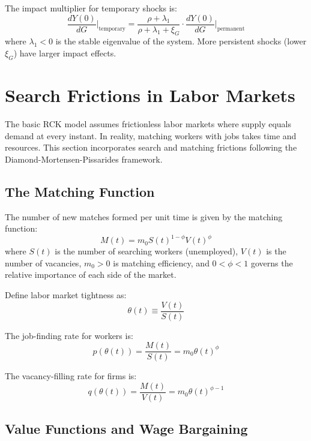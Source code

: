 \documentclass[\topdir/lecture\_notes.tex]{subfiles}
\begin{document}
The impact multiplier for temporary shocks is:
\begin{equation}
\frac{dY(0)}{dG}\bigg|_{\text{temporary}} = \frac{\rho + \lambda_1}{\rho + \lambda_1 + \xi_G} \cdot \frac{dY(0)}{dG}\bigg|_{\text{permanent}}
\end{equation}
where $\lambda_1 < 0$ is the stable eigenvalue of the system. More persistent shocks (lower $\xi_G$) have larger impact effects.

\section{Search Frictions in Labor Markets}

The basic RCK model assumes frictionless labor markets where supply equals demand at every instant. In reality, matching workers with jobs takes time and resources. This section incorporates search and matching frictions following the Diamond-Mortensen-Pissarides framework.

\subsection{The Matching Function}

The number of new matches formed per unit time is given by the matching function:
\begin{equation}
M(t) = m_0 S(t)^{1-\phi} V(t)^\phi
\end{equation}
where $S(t)$ is the number of searching workers (unemployed), $V(t)$ is the number of vacancies, $m_0 > 0$ is matching efficiency, and $0 < \phi < 1$ governs the relative importance of each side of the market.

Define labor market tightness as:
\begin{equation}
\theta(t) \equiv \frac{V(t)}{S(t)}
\end{equation}

The job-finding rate for workers is:
\begin{equation}
p(\theta(t)) = \frac{M(t)}{S(t)} = m_0 \theta(t)^\phi
\end{equation}

The vacancy-filling rate for firms is:
\begin{equation}
q(\theta(t)) = \frac{M(t)}{V(t)} = m_0 \theta(t)^{\phi-1}
\end{equation}

\subsection{Value Functions and Wage Bargaining}
\end{document}
